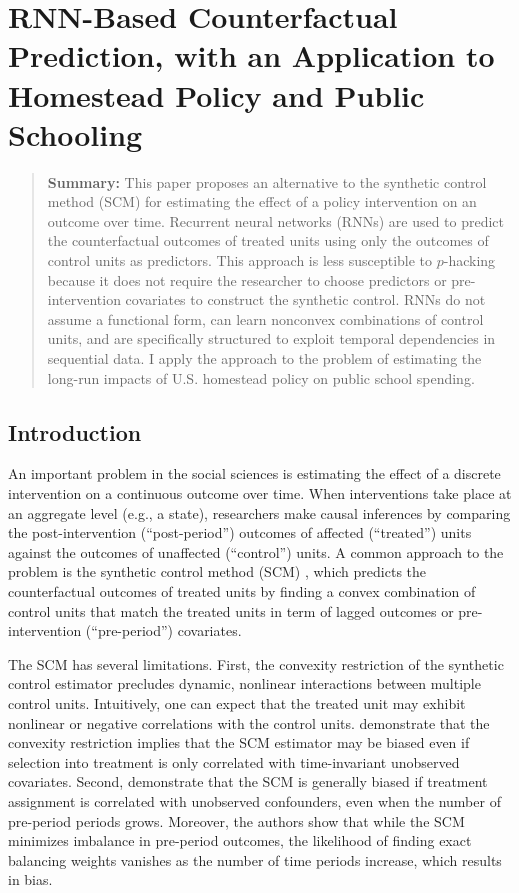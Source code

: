 \chapter[RNN-Based Counterfactual Prediction, with an Application to Homestead Policy and Public Schooling]{RNN-Based Counterfactual Prediction, with an Application to Homestead Policy and Public Schooling}\label{rnns-causal}

\begin{quote}  
	\textbf{Summary:} This paper proposes an alternative to the synthetic control method (SCM) for estimating the effect of a policy intervention on an outcome over time. Recurrent neural networks (RNNs) are used to predict the counterfactual outcomes of treated units using only the outcomes of control units as predictors. This approach is less susceptible to $p$-hacking because it does not require the researcher to choose predictors or pre-intervention covariates to construct the synthetic control. RNNs do not assume a functional form, can learn nonconvex combinations of control units, and are specifically structured to exploit temporal dependencies in sequential data. I apply the approach to the problem of estimating the long-run impacts of U.S. homestead policy on public school spending.
\end{quote}

\clearpage

\section{Introduction} 
\noindent

An important problem in the social sciences is estimating the effect of a discrete intervention on a continuous outcome over time. When interventions take place at an aggregate level (e.g., a state), researchers make causal inferences by comparing the post-intervention (``post-period'') outcomes of affected (``treated'') units against the outcomes of unaffected  (``control'') units. A common approach to the problem is the synthetic control method (SCM) \citep{abadie2010synthetic}, which predicts the counterfactual outcomes of treated units by finding a convex combination of control units that match the treated units in term of lagged outcomes or pre-intervention (``pre-period'') covariates. 

The SCM has several limitations. First, the convexity restriction of the synthetic control estimator precludes dynamic, nonlinear interactions between multiple control units. Intuitively, one can expect that the treated unit may exhibit nonlinear or negative correlations with the control units. \citet{ferman2016revisiting} demonstrate that the convexity restriction implies that the SCM estimator may be biased even if selection into treatment is only correlated with time-invariant unobserved covariates. Second, \citet{ferman2018synthetic} demonstrate that the SCM is generally biased if treatment assignment is correlated with unobserved confounders, even when the number of pre-period periods grows. Moreover, the authors show that while the SCM minimizes imbalance in pre-period outcomes, the likelihood of finding exact balancing weights vanishes as the number of time periods increase, which results in bias. 


